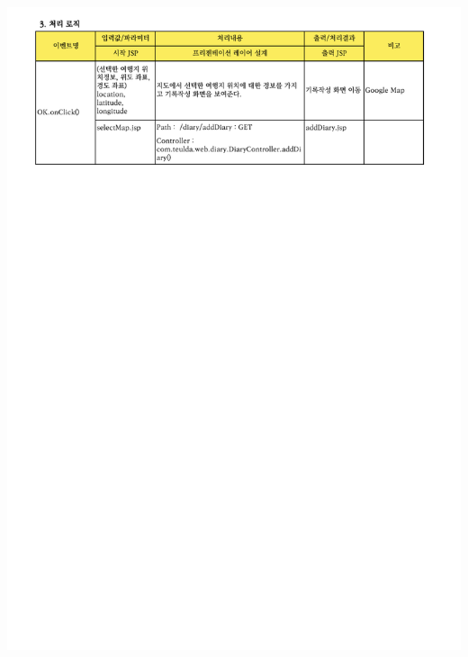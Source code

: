 {{{{{{{{{{{{{{{{{{{{\includegraphics[width=20cm]{./Figure/Design/Display/diary/diary_02.pdf} \\
}}}}}}}}}}}}}}}}}}}}

